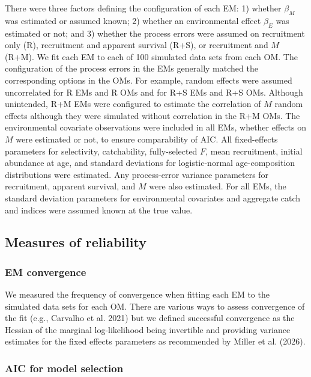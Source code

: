 \documentclass[
  12pt,
]{article}
\begin{document}
There were three factors defining the configuration of each EM: 1)
whether \(\beta_M\) was estimated or assumed known; 2) whether an
environmental effect \(\beta_E\) was estimated or not; and 3) whether
the process errors were assumed on recruitment only (R), recruitment and
apparent survival (R+S), or recruitment and \(M\) (R+M). We fit each EM
to each of 100 simulated data sets from each OM. The configuration of
the process errors in the EMs generally matched the corresponding
options in the OMs. For example, random effects were assumed
uncorrelated for R EMs and R OMs and for R+S EMs and R+S OMs. Although
unintended, R+M EMs were configured to estimate the correlation of \(M\)
random effects although they were simulated without correlation in the
R+M OMs. The environmental covariate observations were included in all
EMs, whether effects on \(M\) were estimated or not, to ensure
comparability of AIC. All fixed-effects parameters for selectivity,
catchability, fully-selected \(F\), mean recruitment, initial abundance
at age, and standard deviations for logistic-normal age-composition
distributions were estimated. Any process-error variance parameters for
recruitment, apparent survival, and \(M\) were also estimated. For all
EMs, the standard deviation parameters for environmental covariates and
aggregate catch and indices were assumed known at the true value.

\subsection*{Measures of reliability}\label{measures-of-reliability}

\subsubsection*{EM convergence}\label{em-convergence}

We measured the frequency of convergence when fitting each EM to the
simulated data sets for each OM. There are various ways to assess
convergence of the fit (e.g., Carvalho et al. 2021) but we defined
successful convergence as the Hessian of the marginal log-likelihood
being invertible and providing variance estimates for the fixed effects
parameters as recommended by Miller et al. (2026).

\subsubsection*{AIC for model selection}\label{aic-for-model-selection}
\end{document}
